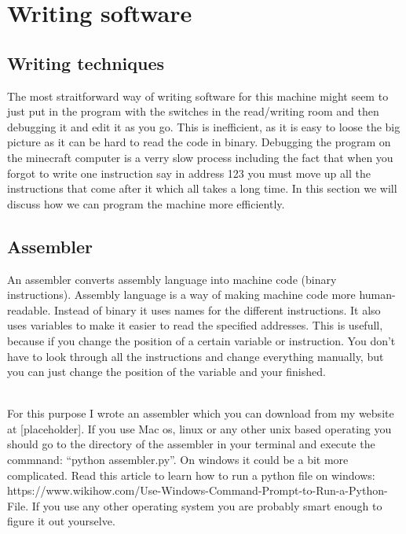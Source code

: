 \documentclass{article}
\newcommand{\assembler}{[placeholder]}
\newcommand{\PyHow}{https://www.wikihow.com/Use-Windows-Command-Prompt-to-Run-a-Python-File}
\begin{document}

\section{Writing software}
\subsection{Writing techniques}
The most straitforward way of writing software for this machine might seem to just put in the program with the switches in the read/writing room and then debugging it and edit it as you go. This is inefficient, as it is easy to loose the big picture as it can be hard to read the code in binary. Debugging the program on the minecraft computer is a verry slow process including the fact that when you forgot to write one instruction say in address 123 you must move up all the instructions that come after it which all takes a long time. In this section we will discuss how we can program the machine more efficiently.
\subsection{Assembler\label{assembler}}
An assembler converts assembly language into machine code (binary instructions). Assembly language is a way of making machine code more human-readable. Instead of binary it uses names for the different instructions. It also uses variables to make it easier to read the specified addresses. This is usefull, because if you change the position of a certain variable or instruction. You don't have to look through all the instructions and change everything manually, but you can just change the position of the variable and your finished.

~\\
For this purpose I wrote an assembler which you can download from my website at \assembler. If you use Mac os, linux or any other unix based operating you should go to the directory of the assembler in your terminal and execute the commnand: ``python assembler.py''. On windows it could be a bit more complicated. Read this article to learn how to run a python file on windows: \PyHow. If you use any other operating system you are probably smart enough to figure it out yourselve.
\end{document}
